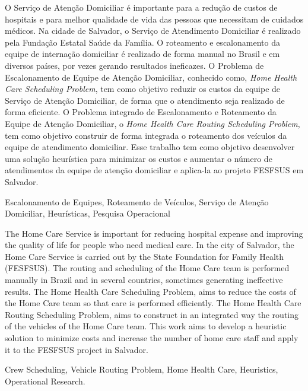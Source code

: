 
\resumo
O Serviço de Atenção Domiciliar é importante para a redução de custos de hospitais e para melhor qualidade de vida das pessoas que necessitam de cuidados médicos.
Na cidade de Salvador, o Serviço de Atendimento Domiciliar é realizado pela Fundação Estatal Saúde da Família.
O roteamento e escalonamento da equipe de internação domiciliar é realizado de forma manual no Brasil e em diversos países, por vezes gerando resultados ineficazes.
O Problema de Escalonamento de Equipe de Atenção Domiciliar, conhecido como, \textit{Home Health Care Scheduling Problem}, tem como objetivo reduzir os custos da equipe de Serviço de Atenção Domiciliar, de forma que o atendimento seja realizado de forma eficiente.
O  Problema integrado de Escalonamento e Roteamento da Equipe de Atenção Domiciliar, o \textit{Home Health Care Routing Scheduling Problem}, tem como objetivo construir de forma integrada o roteamento dos veículos da equipe de atendimento domiciliar.
Esse trabalho tem como objetivo desenvolver uma solução heurística para minimizar os custos e aumentar o número de atendimentos da equipe de atenção domiciliar e aplica-la ao projeto FESFSUS em Salvador.
\begin{keywords}
Escalonamento de Equipes, Roteamento de Veículos, Serviço de Atenção Domiciliar, Heurísticas, Pesquisa Operacional
\end{keywords}


\abstract
The Home Care Service is important for reducing hospital expense and improving the quality of life for people who need medical care.
In the city of Salvador, the Home Care Service is carried out by the State Foundation for Family Health (FESFSUS).
The routing and scheduling of the Home Care team is performed manually in Brazil and in several countries, sometimes  generating ineffective results.
The Home Health Care Scheduling Problem, aims to reduce the costs of the Home Care team so that care is performed efficiently.
The Home Health Care Routing Scheduling Problem, aims to construct in an integrated way the routing of the vehicles of the Home Care team.
This work aims to develop a heuristic solution to minimize costs and increase the number of home care staff and apply it to the FESFSUS project in Salvador.
\begin{keywords}
Crew Scheduling, Vehicle Routing Problem, Home Health Care, Heuristics, Operational Research.
\end{keywords}
